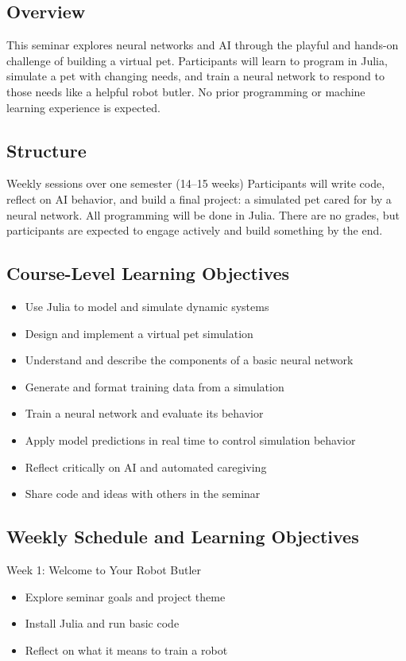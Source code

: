 \documentclass[10pt]{book}
\begin{document}
\subsection*{Overview}
This seminar explores neural networks and AI through the playful and hands-on challenge of building a virtual pet. Participants will learn to program in Julia, simulate a pet with changing needs, and train a neural network to respond to those needs like a helpful robot butler. No prior programming or machine learning experience is expected.

\subsection*{Structure}
Weekly sessions over one semester (14–15 weeks)
Participants will write code, reflect on AI behavior, and build a final project: a simulated pet cared for by a neural network.
All programming will be done in Julia.
There are no grades, but participants are expected to engage actively and build something by the end.

\subsection*{Course-Level Learning Objectives}
\begin{itemize}
  \item Use Julia to model and simulate dynamic systems
  \item Design and implement a virtual pet simulation
  \item Understand and describe the components of a basic neural network
  \item Generate and format training data from a simulation
  \item Train a neural network and evaluate its behavior
  \item Apply model predictions in real time to control simulation behavior
  \item Reflect critically on AI and automated caregiving
  \item Share code and ideas with others in the seminar
\end{itemize}

\subsection*{Weekly Schedule and Learning Objectives}

Week 1: Welcome to Your Robot Butler
\begin{itemize}
  \item Explore seminar goals and project theme
  \item Install Julia and run basic code
  \item Reflect on what it means to train a robot
\end{itemize}
\end{document}
